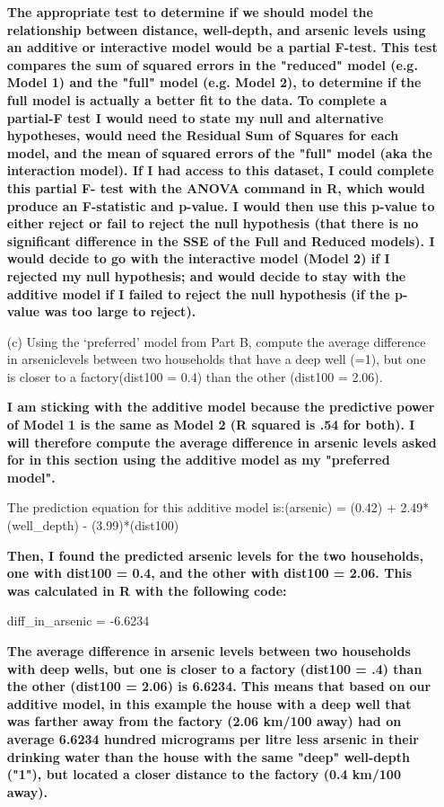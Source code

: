 \documentclass[12pt,letterpaper]{article}
\begin{document}
\begin{enumerate}
	\textbf{The appropriate test to determine if we should model the relationship between distance, well-depth, and arsenic levels using an additive or interactive model would be a partial F-test. This test compares the sum of squared errors in the "reduced" model (e.g. Model 1) and the "full" model (e.g. Model 2), to determine if the full model is actually a better fit to the data. To complete a partial-F test I would need to state my null and alternative hypotheses, would need the Residual Sum of Squares for each model, and the mean of squared errors of the "full" model (aka the interaction model). If I had access to this dataset, I could complete this partial F- test with the ANOVA command in R, which would produce an F-statistic and p-value. I would then use this p-value to either reject or fail to reject the null hypothesis (that there is no significant difference in the SSE of the Full and Reduced models). I would decide to go with the interactive model (Model 2) if I rejected my null hypothesis; and would decide to stay with the additive model if I failed to reject the null hypothesis (if the p-value was too large to reject).}
	
	\item [(c)] Using the ‘preferred’ model from Part B, compute the average difference in arseniclevels between two households that have a deep well (=1), but one is closer to a factory(dist100 = 0.4) than the other (dist100 = 2.06).
	
	\textbf{I am sticking with the additive model because the predictive power of Model 1 is the same as Model 2 (R squared is .54 for both). I will therefore compute the average difference in arsenic levels asked for in this section using the additive model as my "preferred model".}
	
	The prediction equation for this additive model is:(arsenic) = (0.42) + 2.49*(well\_depth) - (3.99)*(dist100)
	
	\textbf{Then, I found the predicted arsenic levels for the two households, one with dist100 = 0.4, and the other with dist100 = 2.06. This was calculated in R with the following code:}
	
		
	
	diff\_in\_arsenic = -6.6234
	
	\textbf{The average difference in arsenic levels between two households with deep wells, but one is closer to a factory (dist100 = .4) than the other (dist100 = 2.06) is 6.6234. This means that based on our additive model, in this example the house with a deep well that was farther away from the factory (2.06 km/100 away) had on average 6.6234 hundred micrograms per litre less arsenic in their drinking water than the house with the same "deep" well-depth ("1"), but located a closer distance to the factory (0.4 km/100 away).}
	
\end{enumerate}  
\end{document}
